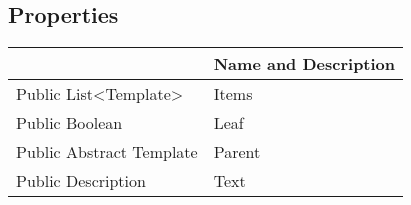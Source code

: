 \documentclass[11pt, oneside, a4paper]{book}
\begin{document}
\subsection{Properties}
\begin{center}
\begin{tabular}{| p{3cm} | p{12cm} | }
\hline
\textbf{ } & \textbf{ Name and Description}\\
\hline
 Public  List<Template> &  Items\hypertarget{SoftwareEngineeringTools.{}Documentation.{}TextTemplate.{}Items}{}\\
\hline
 Public  Boolean &  Leaf\hypertarget{SoftwareEngineeringTools.{}Documentation.{}TextTemplate.{}Leaf}{}\\
\hline
 Public  Abstract  Template &  Parent\hypertarget{SoftwareEngineeringTools.{}Documentation.{}TextTemplate.{}Parent}{}\\
\hline
 Public  Description &  Text\hypertarget{SoftwareEngineeringTools.{}Documentation.{}TextTemplate.{}Text}{}\\
\hline
\end{tabular}
\end{center}
\end{document}
